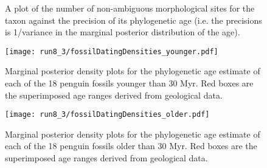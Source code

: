 \documentclass[11pt]{article}
\begin{document}
\begin{figure}
\caption{A plot of the number of non-ambiguous morphological sites for the taxon against the precision of its phylogenetic age (i.e. the precisions is 1/variance in the marginal posterior distribution of the age).}
\end{figure}

\begin{figure}
\texttt{[image: run8\_3/fossilDatingDensities\_younger.pdf]}
\caption{Marginal posterior density plots for the phylogenetic age estimate of each of the 18 penguin fossils younger than 30 Myr. Red boxes are the superimposed age ranges derived from geological data.}
\end{figure}

\begin{figure}
\texttt{[image: run8\_3/fossilDatingDensities\_older.pdf]}
\caption{Marginal posterior density plots for the phylogenetic age estimate of each of the 18 penguin fossils older than 30 Myr. Red boxes are the superimposed age ranges derived from geological data.}
\end{figure}
\end{document}
